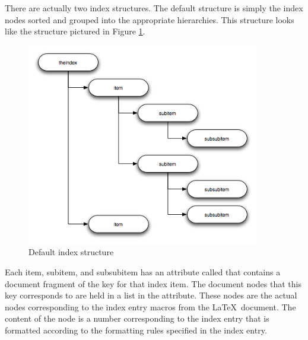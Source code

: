 There are actually two index structures.  The default structure is simply 
the index nodes sorted and grouped into the appropriate hierarchies.
This structure looks like the structure pictured in Figure 
\ref{fig:defaultindex}.
\begin{figure}[ht]
\begin{center}
\includegraphics[width=4in]{defaultindex}
\end{center}
\caption{Default index structure\label{fig:defaultindex}}
\end{figure}

Each item, subitem, and subsubitem has an attribute called 
that contains a document fragment of the key for that index item.
The document nodes that this key corresponds to are held in a list
in the  attribute.  These nodes are the actual 
nodes corresponding to the index entry macros from the \LaTeX\ document.
The content of the node is a number corresponding to the index entry
that is formatted according to the formatting rules specified in the
index entry.

